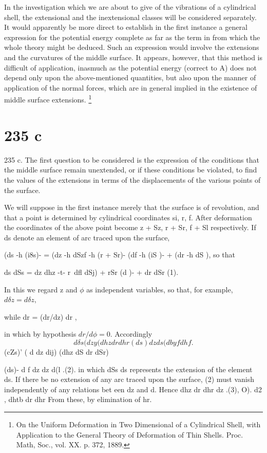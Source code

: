 In the investigation which we are about to give of the vibrations of a
cylindrical shell, the extensional and the inextensional classes will be
considered separately. It would apparently be more direct to establish in the
first instance a general expression for the potential energy complete as far as
the term in from which the whole theory might be deduced.  Such an expression
would involve the extensions and the curvatures of the middle surface. It
appears, however, that this method is difficult of application, inasmuch as the
potential energy (correct to A) does not depend only upon the above-mentioned
quantities, but also upon the manner of application of the normal forces, which
are in general implied in the existence of middle surface extensions.
\footnote{On the Uniform Deformation in Two Dimensional of a Cylindrical Shell, with
Application to the General Theory of Deformation of Thin Shells. Proc. Math,
Soc., vol. XX. p. 372, 1889.}

\section{235 c} %
235 c. The first question to be considered is the expression of the conditions
that the middle surface remain unextended, or if these conditions be violated,
to find the values of the extensions in terms of the displacements of the
various points of the surface.

We will suppose in the first instance merely that the surface is of revolution,
and that a point is determined by cylindrical coordinates si, r, f. After
deformation the coordinates of the above point become z + Sz, r + Sr, f + Sl
respectively. If ds denote an element of arc traced upon the surface,

(ds -h (i8s)- = (dz -h dSzf -h (r + Sr)- (df  -h (iS )- + (dr -h dS ), so that

ds dSs = dz dhz -t- r~dfl dSj) + rSr (d )- + dr dSr (1).

In this we regard z and \(\phi\) as independent variables, so that, for example,
\(
d \delta z  =  d \delta z,
\)

while dr = (dr/dz) dr ,

in which by hypothesis \(dr/d \phi = 0\). Accordingly
\[
d \delta s (dzy (dhz dr dhr (ds) dz ds (dby f  dhf .
\]
(cZs)' ( d dz dij) (dhz dS dr dSr)

(ds)- d f dz  dz d(l .(2).  in which dSs ds represents the extension of the
element ds. If there be no extension of any arc traced upon the surface, (2)
must vanish independently of any relations bet een dz and d. Hence dhz dr dhr
dz .(3), O).  d2 , dhtb dr dhr From these, by elimination of hr.

